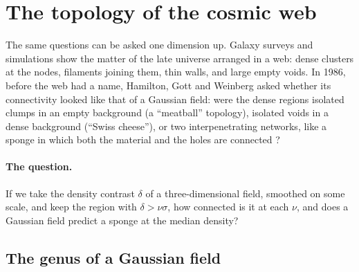 \section{The topology of the cosmic web}
\label{T3a:sec:web}

The same questions can be asked one dimension up. Galaxy surveys and simulations show the matter of the late universe arranged in a web: dense clusters at the nodes, filaments joining them, thin walls, and large empty voids. In 1986, before the web had a name, Hamilton, Gott and Weinberg asked whether its connectivity looked like that of a Gaussian field: were the dense regions isolated clumps in an empty background (a ``meatball'' topology), isolated voids in a dense background (``Swiss cheese''), or two interpenetrating networks, like a sponge in which both the material and the holes are connected \cite{HamiltonGottWeinberg1986}?

\paragraph{The question.} If we take the density contrast $\delta$ of a three-dimensional field, smoothed on some scale, and keep the region with $\delta>\nu\sigma$, how connected is it at each $\nu$, and does a Gaussian field predict a sponge at the median density?

\subsection{The genus of a Gaussian field}
\label{T3a:sec:genus}

